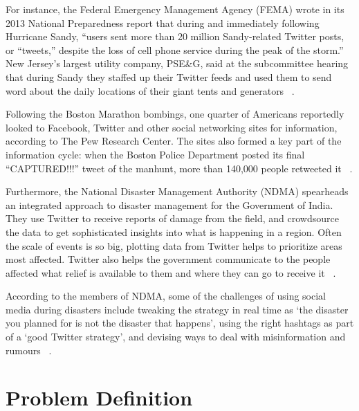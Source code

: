 For instance, the Federal Emergency Management Agency (FEMA) wrote in its 2013 National Preparedness report that during and immediately following Hurricane Sandy, “users sent more than 20 million Sandy-related Twitter posts, or “tweets,” despite the loss of cell phone service during the peak of the storm.” New Jersey’s largest utility company, PSE\&G, said at the subcommittee hearing that during Sandy they staffed up their Twitter feeds and used them to send word about the daily locations of their giant tents and generators ~\citep{scientificamer}.

Following the Boston Marathon bombings, one quarter of Americans reportedly looked to Facebook, Twitter and other social networking sites for information, according to The Pew Research Center. The sites also formed a key part of the information cycle: when the Boston Police Department posted its final “CAPTURED!!!” tweet of the manhunt, more than 140,000 people retweeted it ~\citep{scientificamer}.

Furthermore, the National Disaster Management Authority (NDMA) spearheads an integrated approach to disaster management for the Government of India. They use Twitter to receive reports of damage from the field, and crowdsource the data to get sophisticated insights into what is happening in a region. Often the scale of events is so big, plotting data from Twitter helps to prioritize areas most affected. Twitter also helps the government communicate to the people affected what relief is available to them and where they can go to receive it ~\citep{twittercrisisblog}.

According to the members of NDMA, some of the challenges of using social media during disasters include tweaking the strategy in real time as ‘the disaster you planned for is not the disaster that happens’, using the right hashtags as part of a ‘good Twitter strategy', and devising ways to deal with misinformation and rumours ~\citep{twittercrisisblog}.

\section{Problem Definition}
\label{problemdefinition}

